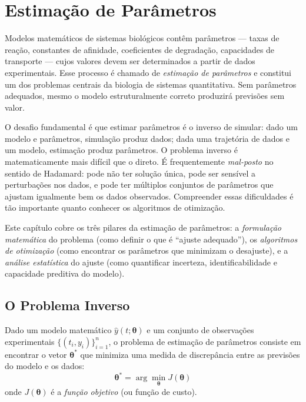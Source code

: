 \chapter{Estimação de Parâmetros}
\label{cap:05}

Modelos matemáticos de sistemas biológicos contêm parâmetros --- taxas de reação,
constantes de afinidade, coeficientes de degradação, capacidades de transporte --- cujos
valores devem ser determinados a partir de dados experimentais. Esse processo é chamado de
\emph{estimação de parâmetros} e constitui um dos problemas centrais da biologia de
sistemas quantitativa. Sem parâmetros adequados, mesmo o modelo estruturalmente correto
produzirá previsões sem valor.

O desafio fundamental é que estimar parâmetros é o inverso de simular: dado um modelo e
parâmetros, simulação produz dados; dada uma trajetória de dados e um modelo, estimação
produz parâmetros. O problema inverso é matematicamente mais difícil que o direto. É
frequentemente \emph{mal-posto} no sentido de Hadamard: pode não ter solução única, pode ser
sensível a perturbações nos dados, e pode ter múltiplos conjuntos de parâmetros que ajustam
igualmente bem os dados observados. Compreender essas dificuldades é tão importante quanto
conhecer os algoritmos de otimização.

Este capítulo cobre os três pilares da estimação de parâmetros: a \emph{formulação
matemática} do problema (como definir o que é ``ajuste adequado''), os \emph{algoritmos de
otimização} (como encontrar os parâmetros que minimizam o desajuste), e a
\emph{análise estatística} do ajuste (como quantificar incerteza, identificabilidade e
capacidade preditiva do modelo).

\section{O Problema Inverso}

\begin{definicaoenv}
Dado um modelo matemático $\hat{y}(t; \boldsymbol{\theta})$ e um conjunto de observações
experimentais $\{(t_i, y_i)\}_{i=1}^n$, o problema de estimação de parâmetros consiste em
encontrar o vetor $\boldsymbol{\theta}^*$ que minimiza uma medida de discrepância entre as
previsões do modelo e os dados:
\begin{equation}
\boldsymbol{\theta}^* = \arg\min_{\boldsymbol{\theta}} J(\boldsymbol{\theta})
\end{equation}
onde $J(\boldsymbol{\theta})$ é a \emph{função objetivo} (ou função de custo).
\end{definicaoenv}

